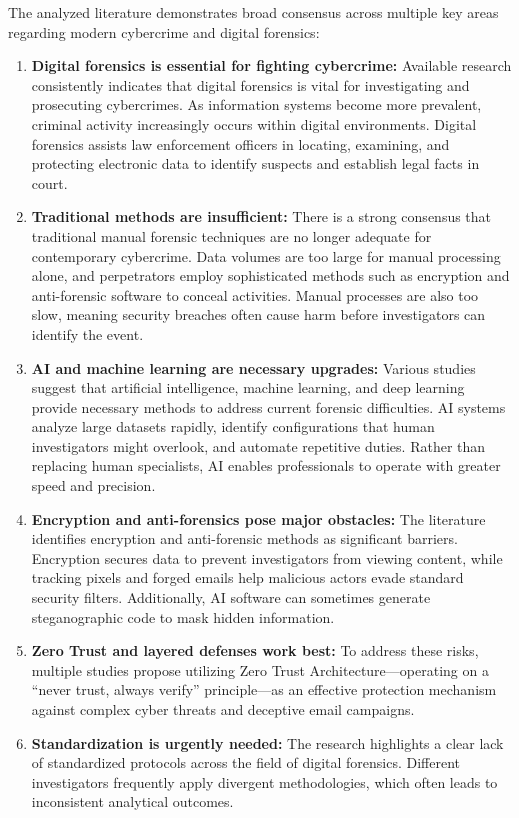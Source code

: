 \documentclass[12pt,a4paper]{article}
\begin{document}
The analyzed literature demonstrates broad consensus across multiple key areas regarding modern cybercrime and digital forensics:

\begin{enumerate}
    \item \textbf{Digital forensics is essential for fighting cybercrime:} Available research consistently indicates that digital forensics is vital for investigating and prosecuting cybercrimes. As information systems become more prevalent, criminal activity increasingly occurs within digital environments. Digital forensics assists law enforcement officers in locating, examining, and protecting electronic data to identify suspects and establish legal facts in court.
    \item \textbf{Traditional methods are insufficient:} There is a strong consensus that traditional manual forensic techniques are no longer adequate for contemporary cybercrime. Data volumes are too large for manual processing alone, and perpetrators employ sophisticated methods such as encryption and anti-forensic software to conceal activities. Manual processes are also too slow, meaning security breaches often cause harm before investigators can identify the event.
    \item \textbf{AI and machine learning are necessary upgrades:} Various studies suggest that artificial intelligence, machine learning, and deep learning provide necessary methods to address current forensic difficulties. AI systems analyze large datasets rapidly, identify configurations that human investigators might overlook, and automate repetitive duties. Rather than replacing human specialists, AI enables professionals to operate with greater speed and precision.
    \item \textbf{Encryption and anti-forensics pose major obstacles:} The literature identifies encryption and anti-forensic methods as significant barriers. Encryption secures data to prevent investigators from viewing content, while tracking pixels and forged emails help malicious actors evade standard security filters. Additionally, AI software can sometimes generate steganographic code to mask hidden information.
    \item \textbf{Zero Trust and layered defenses work best:} To address these risks, multiple studies propose utilizing Zero Trust Architecture---operating on a ``never trust, always verify'' principle---as an effective protection mechanism against complex cyber threats and deceptive email campaigns.
    \item \textbf{Standardization is urgently needed:} The research highlights a clear lack of standardized protocols across the field of digital forensics. Different investigators frequently apply divergent methodologies, which often leads to inconsistent analytical outcomes.
\end{enumerate}
\end{document}
